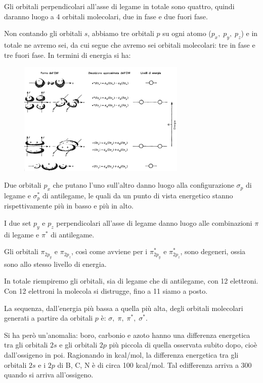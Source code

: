 Gli orbitali perpendicolari all'asse di legame in totale sono quattro, quindi daranno luogo a 4 orbitali molecolari, due in fase e due fuori fase.

Non contando gli orbitali $s$, abbiamo tre orbitali $p$ su ogni atomo ($p_x, \; p_y, \; p_z$) e in totale ne avremo sei, da cui segue che avremo sei orbitali molecolari: tre in fase e tre fuori fase.
In termini di energia si ha:

\begin{figure}[htp]
    \centering
    \includegraphics[width=8cm]{immagini/equazioni_orbitali.png}
\end{figure}

Due orbitali $p_x$ che putano l'uno sull'altro danno luogo alla configurazione $\sigma_p$ di legame e $\sigma^*_p$ di antilegame, le quali da un punto di vista energetico stanno rispettivamente più in basso e più in alto.

I due set $p_y$ e $p_z$ perpendicolari all'asse di legame danno luogo alle combinazioni $\pi$ di legame e $\pi^*$ di antilegame.

Gli orbitali $\pi_{2p_y}$ e $\pi_{2p_z}$, così come avviene per i $\pi_{2p_y}^*$ e $\pi_{2p_z}^*$, sono degeneri, ossia sono allo stesso livello di energia.

In totale riempiremo gli orbitali, sia di legame che di antilegame, con 12 elettroni. Con 12 elettroni la molecola si distrugge, fino a 11 siamo a posto.

La sequenza, dall'energia più bassa a quella più alta, degli orbitali molecolari generati a partire da orbitali $p$ è: $\sigma, \; \pi, \; \pi^*, \; \sigma^*$.

Si ha però un'anomalia: boro, carbonio e azoto hanno una differenza energetica tra gli orbitali $2s$ e gli orbitali $2p$ più piccola di quella osservata subito dopo, cioè dall'ossigeno in poi. Ragionando in kcal/mol, la differenza energetica tra gli orbitali $2s$ e i $2p$ di B, C, N è di circa 100 kcal/mol. Tal edifferenza arriva a 300 quando si arriva all'ossigeno.

